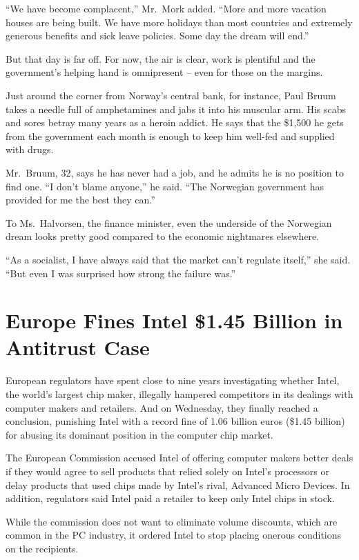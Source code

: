 \documentclass[12pt,a4paper,onecolumn]{article}
\begin{document}
``We have become complacent,'' Mr.~Mork added. ``More and more vacation houses are being built. We
have more holidays than most countries and extremely generous benefits and sick leave policies. Some
day the dream will end.''

But that day is far off. For now, the air is clear, work is plentiful and the government's helping
hand is omnipresent -- even for those on the margins.

Just around the corner from Norway's central bank, for instance, Paul Bruum takes a needle full of
amphetamines and jabs it into his muscular arm. His scabs and sores betray many years as a heroin
addict. He says that the \$1,500 he gets from the government each month is enough to keep him
well-fed and supplied with drugs.

Mr.~Bruum, 32, says he has never had a job, and he admits he is no position to find one. ``I don't
blame anyone,'' he said. ``The Norwegian government has provided for me the best they can.''

To Ms.~Halvorsen, the finance minister, even the underside of the Norwegian dream looks pretty good
compared to the economic nightmares elsewhere.

``As a socialist, I have always said that the market can't regulate itself,'' she said. ``But even I
was surprised how strong the failure was.''


\section{Europe Fines Intel \$1.45 Billion in Antitrust Case}


European regulators have spent close to nine years investigating whether Intel, the world's largest
chip maker, illegally hampered competitors in its dealings with computer makers and retailers. And
on Wednesday, they finally reached a conclusion, punishing Intel with a record fine of 1.06 billion
euros (\$1.45 billion) for abusing its dominant position in the computer chip market.

The European Commission accused Intel of offering computer makers better deals if they would agree
to sell products that relied solely on Intel's processors or delay products that used chips made by
Intel's rival, Advanced Micro Devices. In addition, regulators said Intel paid a retailer to keep
only Intel chips in stock.

While the commission does not want to eliminate volume discounts, which are common in the PC
industry, it ordered Intel to stop placing onerous conditions on the recipients.
\end{document}
